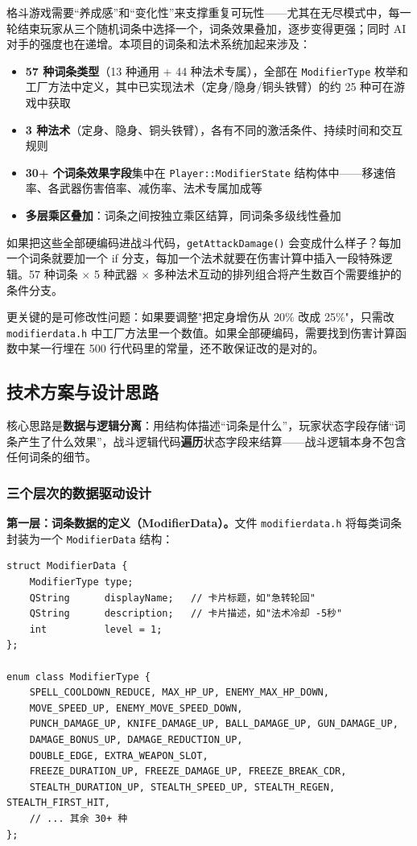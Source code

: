 \documentclass[utf8]{ctexart}
\begin{document}
格斗游戏需要“养成感”和“变化性”来支撑重复可玩性——尤其在无尽模式中，每一轮结束玩家从三个随机词条中选择一个，词条效果叠加，逐步变得更强；同时 AI 对手的强度也在递增。本项目的词条和法术系统加起来涉及：

\begin{itemize}
  \item \textbf{57 种词条类型}（13 种通用 + 44 种法术专属），全部在 \texttt{ModifierType} 枚举和工厂方法中定义，其中已实现法术（定身/隐身/铜头铁臂）的约 25 种可在游戏中获取
  \item \textbf{3 种法术}（定身、隐身、铜头铁臂），各有不同的激活条件、持续时间和交互规则
  \item \textbf{30+ 个词条效果字段}集中在 \texttt{Player::ModifierState} 结构体中——移速倍率、各武器伤害倍率、减伤率、法术专属加成等
  \item \textbf{多层乘区叠加}：词条之间按独立乘区结算，同词条多级线性叠加
\end{itemize}

如果把这些全部硬编码进战斗代码，\texttt{getAttackDamage()} 会变成什么样子？每加一个词条就要加一个 if 分支，每加一个法术就要在伤害计算中插入一段特殊逻辑。57 种词条 $\times$ 5 种武器 $\times$ 多种法术互动的排列组合将产生数百个需要维护的条件分支。

更关键的是可修改性问题：如果要调整"把定身增伤从 20\% 改成 25\%"，只需改 \texttt{modifierdata.h} 中工厂方法里一个数值。如果全部硬编码，需要找到伤害计算函数中某一行埋在 500 行代码里的常量，还不敢保证改的是对的。

\subsection{技术方案与设计思路}

核心思路是\textbf{数据与逻辑分离}：用结构体描述“词条是什么”，玩家状态字段存储“词条产生了什么效果”，战斗逻辑代码\textbf{遍历}状态字段来结算——战斗逻辑本身不包含任何词条的细节。

\subsubsection{三个层次的数据驱动设计}

\textbf{第一层：词条数据的定义（ModifierData）。}文件 \texttt{modifierdata.h} 将每类词条封装为一个 \texttt{ModifierData} 结构：

\begin{verbatim}
struct ModifierData {
    ModifierType type;
    QString      displayName;   // 卡片标题，如"急转轮回"
    QString      description;   // 卡片描述，如"法术冷却 -5秒"
    int          level = 1;
};

enum class ModifierType {
    SPELL_COOLDOWN_REDUCE, MAX_HP_UP, ENEMY_MAX_HP_DOWN,
    MOVE_SPEED_UP, ENEMY_MOVE_SPEED_DOWN,
    PUNCH_DAMAGE_UP, KNIFE_DAMAGE_UP, BALL_DAMAGE_UP, GUN_DAMAGE_UP,
    DAMAGE_BONUS_UP, DAMAGE_REDUCTION_UP,
    DOUBLE_EDGE, EXTRA_WEAPON_SLOT,
    FREEZE_DURATION_UP, FREEZE_DAMAGE_UP, FREEZE_BREAK_CDR,
    STEALTH_DURATION_UP, STEALTH_SPEED_UP, STEALTH_REGEN, STEALTH_FIRST_HIT,
    // ... 其余 30+ 种
};
\end{verbatim}
\end{document}
